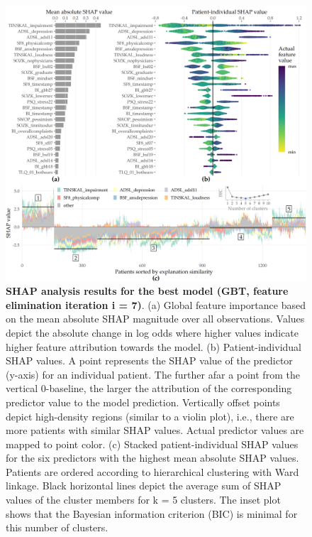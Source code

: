 \documentclass[
  oneside]{book}
\begin{document}
\begin{figure}[htb]

{\centering \includegraphics[width=1\linewidth]{figures/08-tq-xgboost} 

}

\caption{\textbf{SHAP analysis results for the best model (GBT, feature elimination iteration i = 7)}. (a) Global feature importance based on the mean absolute SHAP magnitude over all observations. Values depict the absolute change in log odds where higher values indicate higher feature attribution towards the model. (b) Patient-individual SHAP values. A point represents the SHAP value of the predictor (y-axis) for an individual patient. The further afar a point from the vertical 0-baseline, the larger the attribution of the corresponding predictor value to the model prediction. Vertically offset points depict high-density regions (similar to a violin plot), i.e., there are more patients with similar SHAP values. Actual predictor values are mapped to point color. (c) Stacked patient-individual SHAP values for the six predictors with the highest mean absolute SHAP values. Patients are ordered according to hierarchical clustering with Ward linkage. Black horizontal lines depict the average sum of SHAP values of the cluster members for k = 5 clusters. The inset plot shows that the Bayesian information criterion (BIC) is minimal for this number of clusters.}\label{fig:08-tq-xgboost}
\end{figure}
\end{document}
